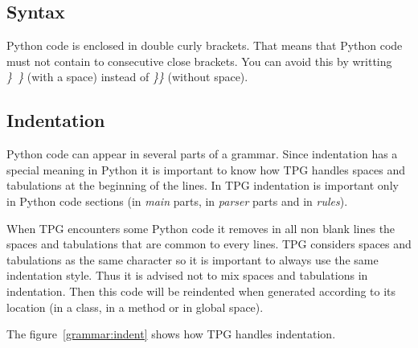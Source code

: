 \subsection{Syntax}

Python code is enclosed in double curly brackets.
That means that Python code must not contain to consecutive close brackets.
You can avoid this by writting \emph{\}~\}} (with a space) instead of \emph{\}\}} (without space).

\subsection{Indentation}

Python code can appear in several parts of a grammar.
Since indentation has a special meaning in Python it is important to know how TPG handles spaces and tabulations at the beginning of the lines.
In TPG indentation is important only in Python code sections (in \emph{main} parts, in \emph{parser} parts and in \emph{rules}).

When TPG encounters some Python code it removes in all non blank lines the spaces and tabulations that are common to every lines.
TPG considers spaces and tabulations as the same character so it is important to always use the same indentation style.
Thus it is advised not to mix spaces and tabulations in indentation.
Then this code will be reindented when generated according to its location (in a class, in a method or in global space).

The figure~\ref{grammar:indent} shows how TPG handles indentation.

